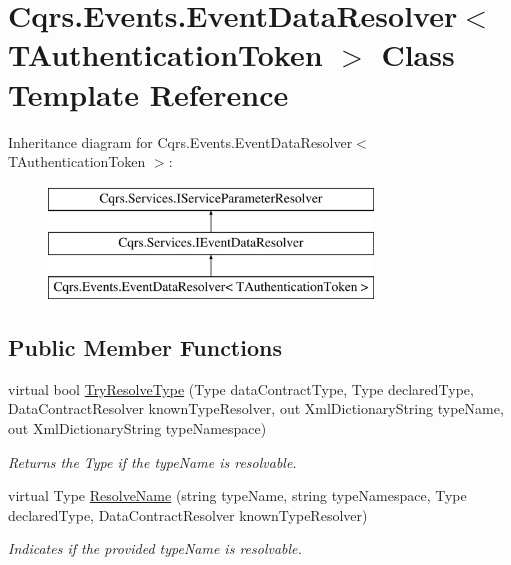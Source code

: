 \hypertarget{classCqrs_1_1Events_1_1EventDataResolver}{}\section{Cqrs.\+Events.\+Event\+Data\+Resolver$<$ T\+Authentication\+Token $>$ Class Template Reference}
\label{classCqrs_1_1Events_1_1EventDataResolver}
Inheritance diagram for Cqrs.\+Events.\+Event\+Data\+Resolver$<$ T\+Authentication\+Token $>$\+:\begin{figure}[H]
\begin{center}
\leavevmode
\includegraphics[height=3.000000cm]{classCqrs_1_1Events_1_1EventDataResolver}
\end{center}
\end{figure}
\subsection*{Public Member Functions}
\begin{DoxyCompactItemize}
\item 
virtual bool \hyperlink{classCqrs_1_1Events_1_1EventDataResolver_a62be7cd15bb38f3a4054a62e787c473d_a62be7cd15bb38f3a4054a62e787c473d}{Try\+Resolve\+Type} (Type data\+Contract\+Type, Type declared\+Type, Data\+Contract\+Resolver known\+Type\+Resolver, out Xml\+Dictionary\+String type\+Name, out Xml\+Dictionary\+String type\+Namespace)
\begin{DoxyCompactList}\small\item\em Returns the Type if the {\itshape type\+Name}  is resolvable. \end{DoxyCompactList}\item 
virtual Type \hyperlink{classCqrs_1_1Events_1_1EventDataResolver_ade34415acd009dd3f9f3a43169da43e9_ade34415acd009dd3f9f3a43169da43e9}{Resolve\+Name} (string type\+Name, string type\+Namespace, Type declared\+Type, Data\+Contract\+Resolver known\+Type\+Resolver)
\begin{DoxyCompactList}\small\item\em Indicates if the provided {\itshape type\+Name}  is resolvable. \end{DoxyCompactList}\end{DoxyCompactItemize}


